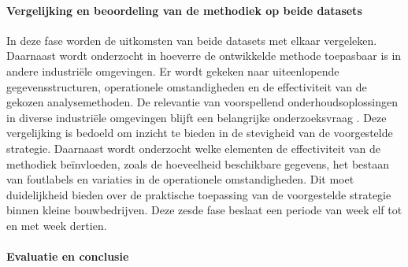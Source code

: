 
\paragraph{Vergelijking en beoordeling van de methodiek op beide datasets}

In deze fase worden de uitkomsten van beide datasets met elkaar vergeleken. Daarnaast wordt onderzocht in hoeverre de ontwikkelde methode toepasbaar is in andere industriële omgevingen. Er wordt gekeken naar uiteenlopende gegevensstructuren, operationele omstandigheden en de effectiviteit van de gekozen analysemethoden. De relevantie van voorspellend onderhoudsoplossingen in diverse industriële omgevingen blijft een belangrijke onderzoeksvraag \autocite{Elahi2023}. Deze vergelijking is bedoeld om inzicht te bieden in de stevigheid van de voorgestelde strategie. Daarnaast wordt onderzocht welke elementen de effectiviteit van de methodiek beïnvloeden, zoals de hoeveelheid beschikbare gegevens, het bestaan van foutlabels en variaties in de operationele omstandigheden. Dit moet duidelijkheid bieden over de praktische toepassing van de voorgestelde strategie binnen kleine bouwbedrijven. Deze zesde fase beslaat een periode van week elf tot en met week dertien.


\paragraph{Evaluatie en conclusie}

